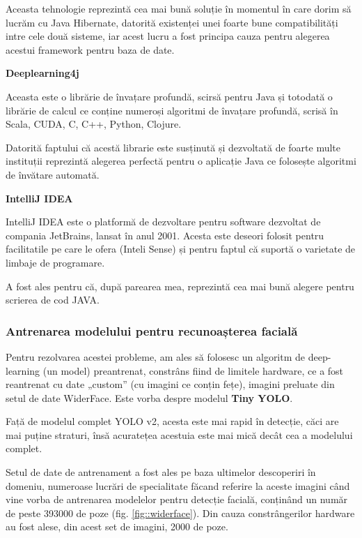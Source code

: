 \documentclass[a4paper, 12pt]{article}
\begin{document}
	\qquad Aceasta tehnologie reprezintă cea mai bună soluție în momentul în care dorim să lucrăm cu Java Hibernate, datorită existenței unei foarte bune compatibilități intre cele două sisteme, iar acest lucru a fost principa cauza pentru alegerea acestui framework pentru baza de date.
	
	\bigskip
	\textbf{Deeplearning4j \cite{team2016deeplearning4j}}
	
	\qquad Aceasta este o librărie de învațare profundă, scirsă pentru Java și totodată o librărie de calcul ce conține numeroși algoritmi de învațare profundă, scrisă în Scala, CUDA, C, C++, Python, Clojure.
	
	\qquad Datorită faptului că acestă librarie este susținută și dezvoltată de foarte multe instituții reprezintă alegerea perfectă pentru o aplicație Java ce folosește algoritmi de învătare automată.
	
	\bigskip
	\textbf{IntelliJ IDEA  \cite{jetbrains}}
	
	\qquad IntelliJ IDEA este o platformă de dezvoltare pentru software dezvoltat de compania JetBrains, lansat în anul 2001. Acesta este deseori folosit pentru facilitatile pe care le ofera (Inteli Sense)	și pentru faptul că suportă o varietate de
	limbaje de programare.
	
	\qquad A fost ales pentru că, după parearea mea, reprezintă cea mai bună alegere pentru scrierea de cod JAVA.
	
	\subsubsection{Antrenarea modelului pentru recunoașterea facială}
	\quad\space Pentru rezolvarea acestei probleme, am ales să folosesc un algoritm de deep-learning (un model) preantrenat, constrâns fiind de limitele hardware, ce a fost reantrenat cu date „custom” (cu imagini ce conțin fețe), imagini preluate din setul de date WiderFace. Este vorba despre modelul \textbf{Tiny YOLO}.
	
	Față de modelul complet YOLO v2, acesta este mai rapid în detecție, căci are mai puține straturi, însă acuratețea acestuia este mai mică decât cea a modelului complet.
	
	Setul de date de antrenament a fost ales pe baza ultimelor descoperiri în domeniu, numeroase lucrări de specialitate făcand referire la aceste imagini când vine vorba de antrenarea modelelor pentru detecție facială, conținând un număr de peste 393000 de poze (fig. \ref{fig::widerface}). Din cauza constrângerilor hardware au fost alese, din acest set de imagini, 2000 de poze.
	
\end{document}
